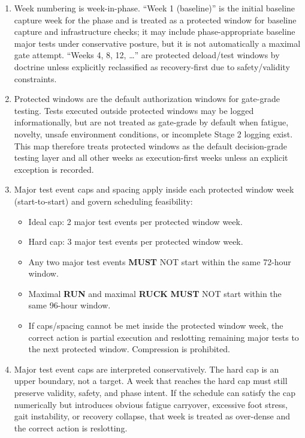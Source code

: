 \documentclass[10pt]{article}
\begin{document}
\begin{enumerate}
\item Week numbering is week-in-phase. “Week 1 (baseline)” is the initial baseline capture week for the phase and is treated as a protected window for baseline capture and infrastructure checks; it may include phase-appropriate baseline major tests under conservative posture, but it is not automatically a maximal gate attempt. “Weeks 4, 8, 12, …” are protected deload/test windows by doctrine unless explicitly reclassified as recovery-first due to safety/validity constraints.

\item Protected windows are the default authorization windows for gate-grade testing. Tests executed outside protected windows may be logged informationally, but are not treated as gate-grade by default when fatigue, novelty, unsafe environment conditions, or incomplete Stage 2 logging exist. This map therefore treats protected windows as the default decision-grade testing layer and all other weeks as execution-first weeks unless an explicit exception is recorded.

\item Major test event caps and spacing apply inside each protected window week (start-to-start) and govern scheduling feasibility:
\begin{itemize}
\item Ideal cap: 2 major test events per protected window week.
\item Hard cap: 3 major test events per protected window week.
\item Any two major test events \textbf{MUST} NOT start within the same 72-hour window.
\item Maximal \textbf{RUN} and maximal \textbf{RUCK} \textbf{MUST} NOT start within the same 96-hour window.
\item If caps/spacing cannot be met inside the protected window week, the correct action is partial execution and reslotting remaining major tests to the next protected window. Compression is prohibited.
\end{itemize}

\item Major test event caps are interpreted conservatively. The hard cap is an upper boundary, not a target. A week that reaches the hard cap must still preserve validity, safety, and phase intent. If the schedule can satisfy the cap numerically but introduces obvious fatigue carryover, excessive foot stress, gait instability, or recovery collapse, that week is treated as over-dense and the correct action is reslotting.


\end{enumerate}
\end{document}
